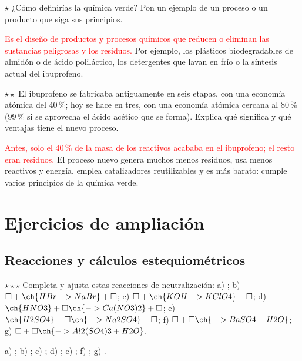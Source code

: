 \begin{exercise}
    \(\star\) ¿Cómo definirías la química verde? Pon un ejemplo de un proceso o un producto que siga sus principios.
    \begin{solu}
        \textcolor{red}{Es el diseño de productos y procesos químicos que reducen o eliminan las sustancias peligrosas y los
        residuos.} Por ejemplo, los plásticos biodegradables de almidón o de ácido poliláctico, los detergentes que lavan en frío o
        la síntesis actual del ibuprofeno.
    \end{solu}
\end{exercise}

\begin{exercise}
    \(\star\star\) El ibuprofeno se fabricaba antiguamente en seis etapas, con una economía atómica del 40\,\%; hoy se hace en tres,
    con una economía atómica cercana al 80\,\% (99\,\% si se aprovecha el ácido acético que se forma). Explica qué significa y qué
    ventajas tiene el nuevo proceso.
    \begin{solu}
        \textcolor{red}{Antes, solo el 40\,\% de la masa de los reactivos acababa en el ibuprofeno; el resto eran residuos.} El
        proceso nuevo genera muchos menos residuos, usa menos reactivos y energía, emplea catalizadores reutilizables y es más
        barato: cumple varios principios de la química verde.
    \end{solu}
\end{exercise}

\section{Ejercicios de ampliación}\label{sec:ud6-ampliacion}

\subsection{Reacciones y cálculos estequiométricos}

\begin{exercise}
    \(\star\star\star\) Completa y ajusta estas reacciones de neutralización: a) ;
    b) \(\square + \ch{HBr -> NaBr} + \square\); c) \(\square + \ch{KOH -> KClO4} + \square\);
    d) \(\ch{HNO3} + \square \ch{-> Ca(NO3)2} + \square\); e) \(\ch{H2SO4} + \square \ch{-> Na2SO4} + \square\);
    f) \(\square + \square \ch{-> BaSO4 + H2O}\); g) \(\square + \square \ch{-> Al2(SO4)3 + H2O}\).
    \begin{solu}
        a) \textcolor{red}{}; b) \textcolor{red}{};
        c) \textcolor{red}{}; d) \textcolor{red}{};
        e) \textcolor{red}{}; f) \textcolor{red}{};
        g) \textcolor{red}{}.
    \end{solu}
\end{exercise}

